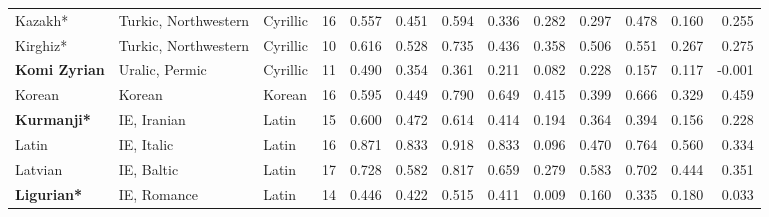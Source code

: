 \begin{tabular}{lllrrrrrrrrrr}
                        Kazakh* &            Turkic, Northwestern &              Cyrillic &        16 &                       0.557 &                         0.451 &         0.594 &                  0.336 &            0.282 &                         0.297 &         0.478 &                  0.160 &            0.255 \\
                       Kirghiz* &            Turkic, Northwestern &              Cyrillic &        10 &                       0.616 &                         0.528 &         0.735 &                  0.436 &            0.358 &                         0.506 &         0.551 &                  0.267 &            0.275 \\
           \textbf{Komi Zyrian} &                  Uralic, Permic &              Cyrillic &        11 &                       0.490 &                         0.354 &         0.361 &                  0.211 &            0.082 &                         0.228 &         0.157 &                  0.117 &           -0.001 \\
                         Korean &                          Korean &                Korean &        16 &                       0.595 &                         0.449 &         0.790 &                  0.649 &            0.415 &                         0.399 &         0.666 &                  0.329 &            0.459 \\
             \textbf{Kurmanji*} &                     IE, Iranian &                 Latin &        15 &                       0.600 &                         0.472 &         0.614 &                  0.414 &            0.194 &                         0.364 &         0.394 &                  0.156 &            0.228 \\
                          Latin &                      IE, Italic &                 Latin &        16 &                       0.871 &                         0.833 &         0.918 &                  0.833 &            0.096 &                         0.470 &         0.764 &                  0.560 &            0.334 \\
                        Latvian &                      IE, Baltic &                 Latin &        17 &                       0.728 &                         0.582 &         0.817 &                  0.659 &            0.279 &                         0.583 &         0.702 &                  0.444 &            0.351 \\
             \textbf{Ligurian*} &                     IE, Romance &                 Latin &        14 &                       0.446 &                         0.422 &         0.515 &                  0.411 &            0.009 &                         0.160 &         0.335 &                  0.180 &            0.033 \\

\end{tabular}
